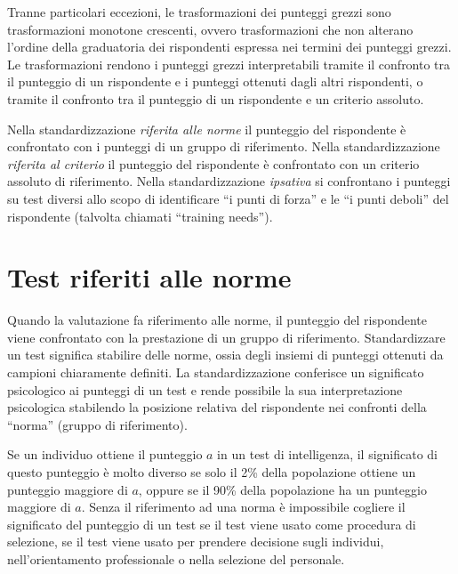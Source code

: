 Tranne particolari eccezioni, le trasformazioni dei punteggi grezzi sono trasformazioni monotone crescenti, ovvero trasformazioni che non alterano l'ordine della graduatoria dei rispondenti espressa nei termini dei punteggi grezzi. Le trasformazioni rendono i punteggi grezzi interpretabili tramite il confronto tra il punteggio di un rispondente e i punteggi ottenuti dagli altri rispondenti, o tramite il confronto tra il punteggio di un rispondente e un criterio assoluto.


Nella standardizzazione \emph{riferita alle norme} il punteggio del rispondente è confrontato con i punteggi di un gruppo di riferimento. 
Nella standardizzazione \emph{riferita al criterio} il punteggio del rispondente è confrontato con un criterio assoluto di riferimento.
Nella standardizzazione \emph{ipsativa} si confrontano i punteggi su test diversi allo scopo di identificare ``i punti di forza'' e le ``i punti deboli'' del rispondente (talvolta chiamati ``training needs'').


\section{Test riferiti alle norme}




Quando la valutazione fa riferimento alle norme, il punteggio del rispondente viene confrontato con la prestazione di un gruppo di riferimento.
 Standardizzare un test significa stabilire delle norme, ossia degli insiemi di punteggi ottenuti da campioni chiaramente definiti.
 La standardizzazione conferisce un significato psicologico ai punteggi di un test e rende possibile la sua interpretazione psicologica stabilendo la posizione relativa del rispondente nei confronti della ``norma'' (gruppo di riferimento).

Se un individuo ottiene il punteggio $a$ in un test di intelligenza, il significato di questo punteggio è molto diverso se solo il 2\% della popolazione ottiene un punteggio maggiore di $a$, oppure se il 90\% della popolazione ha un punteggio maggiore di $a$.
 Senza il riferimento ad una norma è impossibile cogliere il significato del punteggio di un test se il test viene usato come procedura di selezione, se il test viene usato per prendere decisione sugli individui, nell'orientamento professionale o nella selezione del personale.

